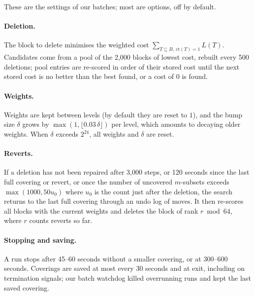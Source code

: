 \documentclass[11pt]{article}
\theoremstyle{remark}
\newcommand{\cov}{\mathrm{ct}}
\begin{document}
These are the settings of our batches; most are options, off by default.

\paragraph{Deletion.} The block to delete minimises the weighted cost $\sum_{T\subseteq B,\ \cov(T)=1}L(T)$. Candidates
come from a pool of the 2{,}000 blocks of lowest cost, rebuilt every 500 deletions; pool entries are re-scored in
order of their stored cost until the next stored cost is no better than the best found, or a cost of $0$ is found.

\paragraph{Weights.} Weights are kept between levels (by default they are reset to $1$), and the bump size $\delta$
grows by $\max(1,\lfloor 0.03\,\delta\rfloor)$ per level, which amounts to decaying older weights. When $\delta$
exceeds $2^{24}$, all weights and $\delta$ are reset.

\paragraph{Reverts.} If a deletion has not been repaired after 3{,}000 steps, or 120 seconds since the last full
covering or revert, or once the number of uncovered $m$-subsets exceeds $\max(1000,50u_0)$ where $u_0$ is the count
just after the deletion, the search returns to the last full covering through an undo log of moves. It then re-scores
all blocks with the current weights and deletes the block of rank $r\bmod 64$, where $r$ counts reverts so far.

\paragraph{Stopping and saving.} A run stops after 45--60 seconds without a smaller covering, or at 300--600 seconds.
Coverings are saved at most every 30 seconds and at exit, including on termination signals; our batch watchdog killed
overrunning runs and kept the last saved covering.
\end{document}
